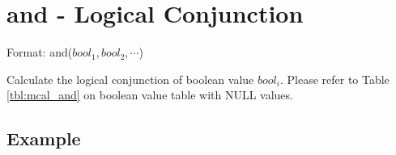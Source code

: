 
%

\section{and - Logical Conjunction\label{sect:and}}

Format: and($bool_1,bool_2,\cdots$)

Calculate the logical conjunction of boolean value $bool_i$. Please refer to Table \ref{tbl:mcal_and} on boolean value table with NULL values. 


\subsection*{Example}


%

